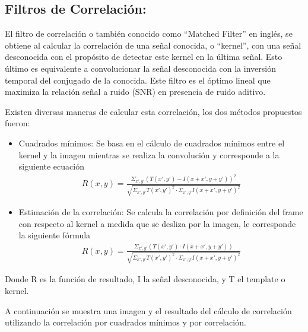 \subsection{Filtros de Correlación:}
\label{sec:corr}
El filtro de correlación o también conocido como ``Matched Filter'' \cite{ref:Corr} en inglés, se obtiene al calcular la correlación de una señal conocida, o ``kernel'', con una señal desconocida con el propósito de detectar este kernel en la última señal. Esto último es equivalente a convolucionar la señal desconocida con la inversión temporal del conjugado de la conocida. Este filtro es el óptimo lineal que maximiza la relación señal a ruido (SNR) en presencia de ruido aditivo.

Existen diversas maneras de calcular esta correlación, los dos métodos propuestos fueron:
\begin{itemize}
\item Cuadrados mínimos:
Se basa en el cálculo de cuadrados mínimos entre el kernel y la imagen mientras se realiza la convolución y corresponde a la siguiente ecuación
\begin{align}
R(x,y) = \frac{\Sigma_{x',y'} \left( T(x',y') - I(x+x',y+y') \right)^2}{\sqrt{\Sigma_{x',y'} T(x',y')^2  \cdot \Sigma_{x',y'}  I(x+x',y+y')^2}}
\end{align}
\item Estimación de la correlación:
Se calcula la correlación por definición del frame con respecto al kernel a medida que se desliza por la imagen, le corresponde la siguiente fórmula
\begin{align}
R(x,y) = \frac{\Sigma_{x',y'} \left( T(x',y') \cdot I(x+x',y+y') \right)}{\sqrt{\Sigma_{x',y'} T(x',y')^2  \cdot \Sigma_{x',y'}  I(x+x',y+y')^2}}
\end{align}
\end{itemize}
Donde R es la función de resultado, I la señal desconocida, y T el template o kernel.

A continuación se muestra una imagen y el resultado del cálculo de correlación utilizando la correlación por cuadrados mínimos y por correlación.

